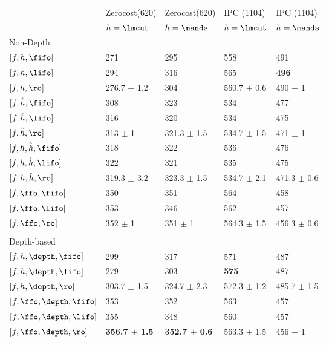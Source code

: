 
\begin{center}
\begin{tabular}{|l|l|l|l|l|}
\hline
 & Zerocost(620) & Zerocost(620) & IPC (1104) & IPC (1104)\\
 & $h=\lmcut$ & $h=\mands$ & $h=\lmcut$ & $h=\mands$\\
\hline
Non-Depth &  &  &  & \\
$[f,h,\fifo]$ & 271 & 295 & 558 & 491\\
$[f,h,\lifo]$ & 294 & 316 & 565 & \textbf{496}\\
$[f,h,\ro]$ & 276.7 $\pm$ 1.2 & 304 & 560.7 $\pm$ 0.6 & 490 $\pm$ 1\\
$[f,\hat{h},\fifo]$ & 308 & 323 & 534 & 477\\
$[f,\hat{h},\lifo]$ & 316 & 320 & 534 & 475\\
$[f,\hat{h},\ro]$ & 313 $\pm$ 1 & 321.3 $\pm$ 1.5 & 534.7 $\pm$ 1.5 & 471 $\pm$ 1\\
$[f,h,\hat{h},\fifo]$ & 318 & 322 & 536 & 476\\
$[f,h,\hat{h},\lifo]$ & 322 & 321 & 535 & 475\\
$[f,h,\hat{h},\ro]$ & 319.3 $\pm$ 3.2 & 323.3 $\pm$ 1.5 & 534.7 $\pm$ 2.1 & 471.3 $\pm$ 0.6\\
$[f,\ffo,\fifo]$ & 350 & 351 & 564 & 458\\
$[f,\ffo,\lifo]$ & 353 & 346 & 562 & 457\\
$[f,\ffo,\ro]$ & 352 $\pm$ 1 & 351 $\pm$ 1 & 564.3 $\pm$ 1.5 & 456.3 $\pm$ 0.6\\
 &  &  &  & \\
Depth-based &  &  &  & \\
$[f,h,\depth,\fifo]$ & 299 & 317 & 571 & 487\\
$[f,h,\depth,\lifo]$ & 279 & 303 & \textbf{575} & 487\\
$[f,h,\depth,\ro]$ & 303.7 $\pm$ 1.5 & 324.7 $\pm$ 2.3 & 572.3 $\pm$ 1.2 & 485.7 $\pm$ 1.5\\
$[f,\ffo,\depth,\fifo]$ & 353 & 352 & 563 & 457\\
$[f,\ffo,\depth,\lifo]$ & 355 & 348 & 560 & 457\\
$[f,\ffo,\depth,\ro]$ & \textbf{356.7 $\pm$ 1.5} & \textbf{352.7 $\pm$ 0.6} & 563.3 $\pm$ 1.5 & 456 $\pm$ 1\\
\hline
\end{tabular}
\end{center}
